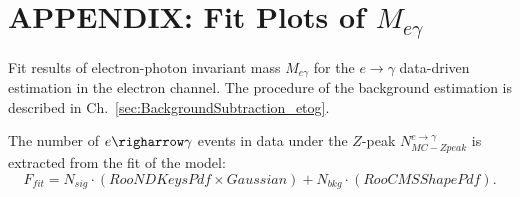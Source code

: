 \section{APPENDIX: Fit Plots of $M_{e\gamma}$}
\label{sec:EtogammaFitPlots}

Fit results of electron-photon invariant mass $M_{e\gamma}$ for the $e \rightarrow \gamma$ data-driven estimation in the electron channel. The procedure of the background estimation is described in Ch.~\ref{sec:BackgroundSubtraction_etog}.

The number of $e\righarrow\gamma$ events in data under the $Z$-peak $N_{MC-Zpeak}^{e\rightarrow\gamma}$ is extracted from the fit of the model: 
\begin{equation}
F_{fit} = N_{sig} \cdot (RooNDKeysPdf \times Gaussian) +  N_{bkg} \cdot (RooCMSShapePdf).
\end{equation}


